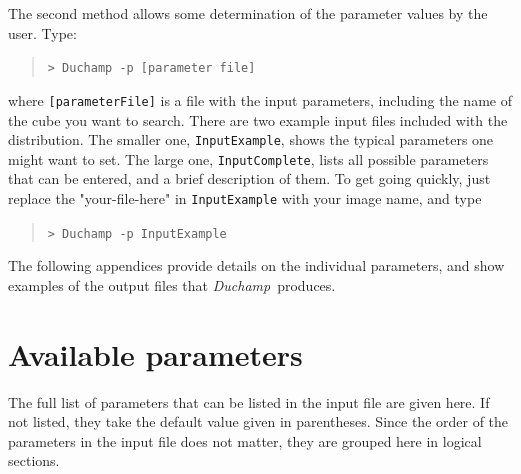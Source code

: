 \documentclass[12pt,a4paper]{article}
\newcommand{\duchamp}{\emph{Duchamp}}
\begin{document}
The second method allows some determination of the parameter values by
the user. Type:
\begin{quote}
\texttt{> Duchamp -p [parameter file]}
\end{quote}
where \texttt{[parameterFile]} is a file with the input parameters,
including the name of the cube you want to search. There are two
example input files included with the distribution. The smaller one,
\texttt{InputExample}, shows the typical parameters one might want to
set. The large one, \texttt{InputComplete}, lists all possible
parameters that can be entered, and a brief description of them. To
get going quickly, just replace the "your-file-here" in
\texttt{InputExample} with your image name, and type
\begin{quote}
\texttt{> Duchamp -p InputExample}
\end{quote}

The following appendices provide details on the individual parameters,
and show examples of the output files that \duchamp\ produces.

\newpage
\section{Available parameters}
\label{app-param}

The full list of parameters that can be listed in the input file are
given here. If not listed, they take the default value given in
parentheses. Since the order of the parameters in the input file does
not matter, they are grouped here in logical sections.
\end{document}
